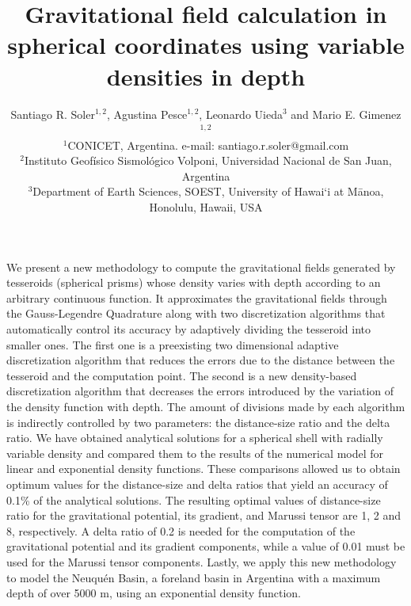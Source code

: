\documentclass[extra, referee]{gji}
\begin{document}
\title[Variable Density Tesseroids]{
    Gravitational field calculation in spherical coordinates using variable
    densities in depth
}
\author[S.R. Soler, A. Pesce, L. Uieda and M.E. Gimenez]{
    Santiago R. Soler$^{1,2}$, Agustina Pesce$^{1,2}$, Leonardo Uieda$^3$ and
    Mario E. Gimenez$^{1,2}$ \\
    $^1$CONICET, Argentina. e-mail: santiago.r.soler@gmail.com\\
    $^2$Instituto Geofísico Sismológico Volponi, Universidad Nacional de
    San Juan, Argentina\\
    $^3$Department of Earth Sciences, SOEST, University of Hawai‘i at
    M\={a}noa, Honolulu, Hawaii, USA
}


\maketitle

\begin{summary}
We present a new methodology to compute the gravitational fields generated by
tesseroids (spherical prisms) whose density varies with depth according to
an arbitrary continuous function.
It approximates the gravitational fields through the Gauss-Legendre Quadrature along
with two discretization algorithms that automatically control its accuracy by adaptively
dividing the tesseroid into smaller ones.
The first one is a preexisting two dimensional adaptive discretization algorithm that
reduces the errors due to the distance between the tesseroid and the computation point.
The second is a new density-based discretization algorithm that
decreases the errors introduced by the variation of the density function with depth.
The amount of divisions made by each algorithm is indirectly controlled
by two parameters: the distance-size ratio and the delta ratio.
We have obtained analytical solutions for a spherical shell with radially variable
density and compared them to the results of the numerical model for linear and
exponential density functions.
These comparisons allowed us to obtain optimum values for the distance-size and
delta ratios that yield an accuracy of 0.1\% of the analytical solutions.
The resulting optimal values of distance-size ratio for the gravitational potential, its
gradient, and Marussi tensor are 1, 2 and 8, respectively.
A delta ratio of 0.2 is needed for the computation of the gravitational potential and
its gradient components, while a value of 0.01 must be used for the Marussi tensor
components.
Lastly, we apply this new methodology to model the Neuqu\'en Basin, a foreland basin in
Argentina with a maximum depth of over 5000 m, using an exponential density function.
\end{summary}
\end{document}
